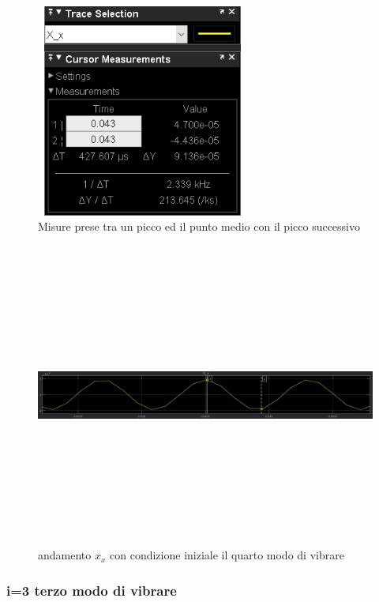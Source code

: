 \documentclass{article}
\begin{document}
\begin{enumerate}
\begin{figure}[H]
\centering
\includegraphics[width=7cm,height=7cm,keepaspectratio]{./simulink/assex/modo4_xtab.png}
\caption{Misure prese tra un picco ed il punto medio con il picco successivo}
\end{figure}
\begin{figure}[H]
\centering
\includegraphics[width=12cm,height=10cm,keepaspectratio]{./simulink/assex/modo4_x.png}
\caption{andamento $x_{x}$ con condizione iniziale il quarto modo di vibrare}

\end{figure}
\end{enumerate}

\subsubsection{i=3 terzo modo di vibrare}
\end{document}
